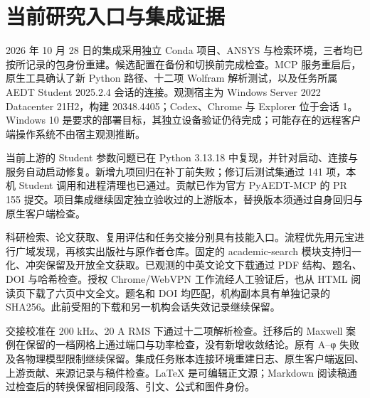\section{当前研究入口与集成证据}
\label{chapter:13}

\hypertarget{13.runtime}{}
2026 年 10 月 28 日的集成采用独立 Conda 项目、ANSYS 与检索环境，三者均已按所记录的包身份重建。候选配置在备份和切换前完成检查。MCP 服务重启后，原生工具确认了新 Python 路径、十二项 Wolfram 解析测试，以及任务所属 AEDT Student 2025.2.4 会话的连接。观测宿主为 Windows Server 2022 Datacenter 21H2，构建 20348.4405；Codex、Chrome 与 Explorer 位于会话 1。Windows 10 是要求的部署目标，其独立设备验证仍待完成；可能存在的远程客户端操作系统不由宿主观测推断。

\hypertarget{13.contribution}{}
当前上游的 Student 参数问题已在 Python 3.13.18 中复现，并针对启动、连接与服务自动启动修复。新增九项回归在补丁前失败；修订后测试集通过 141 项，本机 Student 调用和进程清理也已通过。贡献已作为官方 PyAEDT-MCP 的 PR 155 提交。项目集成继续固定独立验收过的上游版本，替换版本须通过自身回归与原生客户端检查。\cite{PYAEDTMCP}

\hypertarget{13.discovery}{}
科研检索、论文获取、复用评估和任务交接分别具有技能入口。流程优先用元宝进行广域发现，再核实出版社与原作者仓库。固定的 academic-search 模块支持归一化、冲突保留及开放全文获取。已观测的中英文论文下载通过 PDF 结构、题名、DOI 与哈希检查。授权 Chrome/WebVPN 工作流经人工验证后，也从 HTML 阅读页下载了六页中文全文。题名和 DOI 均匹配，机构副本具有单独记录的 SHA256。此前受阻的下载和另一机构会话失效记录继续保留。\cite{ACADEMICSEARCH,C01,ZHU2026}

\hypertarget{13.evidence}{}
交接校准在 200 kHz、20 A RMS 下通过十二项解析检查。迁移后的 Maxwell 案例在保留的一档网格上通过端口与功率检查，没有新增收敛结论。原有 A–φ 失败及各物理模型限制继续保留。集成任务账本连接环境重建日志、原生客户端返回、上游贡献、来源记录与稿件检查。LaTeX 是可编辑正文源；Markdown 阅读稿通过检查后的转换保留相同段落、引文、公式和图件身份。
